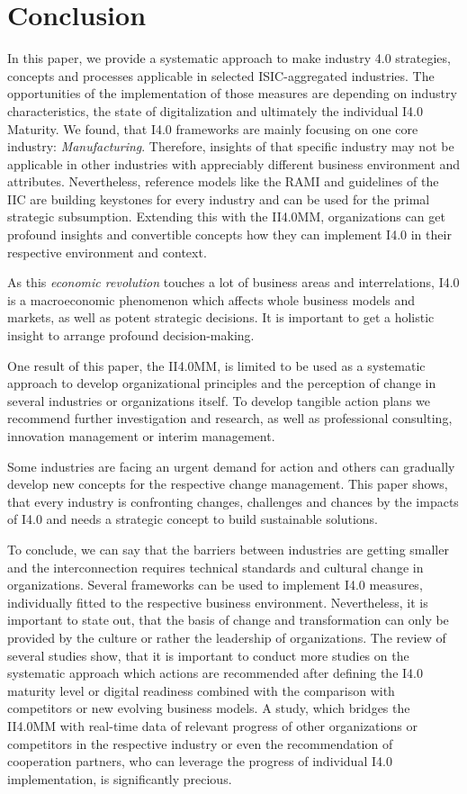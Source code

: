 \section{Conclusion}

In this paper, we provide a systematic approach to make industry 4.0 strategies, concepts and processes applicable in selected \ac{ISIC}-aggregated industries. The opportunities of the implementation of those measures are depending on industry characteristics, the state of digitalization and ultimately the individual \ac{I4.0} Maturity. We found, that \ac{I4.0} frameworks are mainly focusing on one core industry: \emph{Manufacturing}. Therefore, insights of that specific industry may not be applicable in other industries with appreciably different business environment and attributes. Nevertheless, reference models like the \ac{RAMI} and guidelines of the \ac{IIC} are building keystones for every industry and can be used for the primal strategic subsumption. Extending this with the \ac{II4.0MM}, organizations can get profound insights and convertible concepts how they can implement \ac{I4.0} in their respective environment and context.

As this \emph{economic revolution} touches a lot of business areas and interrelations, \ac{I4.0} is a macroeconomic phenomenon which affects whole business models and markets, as well as potent strategic decisions. It is important to get a holistic insight to arrange profound decision-making.

One result of this paper, the \ac{II4.0MM}, is limited to be used as a systematic approach to develop organizational principles and the perception of change in several industries or organizations itself. To develop tangible action plans we recommend further investigation and research, as well as professional consulting, innovation management or interim management.

Some industries are facing an urgent demand for action and others can gradually develop new concepts for the respective change management. This paper shows, that every industry is confronting changes, challenges and chances by the impacts of \ac{I4.0} and needs a strategic concept to build sustainable solutions.

To conclude, we can say that the barriers between industries are getting smaller and the interconnection requires technical standards and cultural change in organizations. Several frameworks can be used to implement \ac{I4.0} measures, individually fitted to the respective business environment. Nevertheless, it is important to state out, that the basis of change and transformation can only be provided by the culture or rather the leadership of organizations. The review of several studies show, that it is important to conduct more studies on the systematic approach which actions are recommended after defining the \ac{I4.0} maturity level or digital readiness combined with the comparison with competitors or new evolving business models. A study, which bridges the \ac{II4.0MM} with real-time data of relevant progress of other organizations or competitors in the respective industry or even the recommendation of cooperation partners, who can leverage the progress of individual \ac{I4.0} implementation, is significantly precious.
